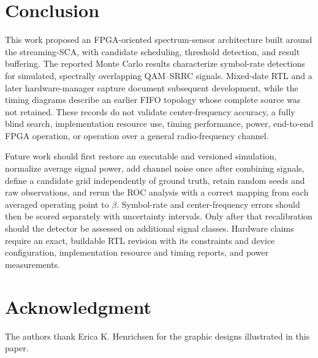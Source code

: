 \documentclass[conference]{IEEEtran}
\begin{document}
\section{Conclusion}
This work proposed an FPGA-oriented spectrum-sensor architecture built around the streaming-SCA, with candidate scheduling, threshold detection, and result buffering. The reported Monte Carlo results characterize symbol-rate detections for simulated, spectrally overlapping QAM--SRRC signals. Mixed-date RTL and a later hardware-manager capture document subsequent development, while the timing diagrams describe an earlier FIFO topology whose complete source was not retained. These records do not validate center-frequency accuracy, a fully blind search, implementation resource use, timing performance, power, end-to-end FPGA operation, or operation over a general radio-frequency channel.

Future work should first restore an executable and versioned simulation, normalize average signal power, add channel noise once after combining signals, define a candidate grid independently of ground truth, retain random seeds and raw observations, and rerun the ROC analysis with a correct mapping from each averaged operating point to $\beta$. Symbol-rate and center-frequency errors should then be scored separately with uncertainty intervals. Only after that recalibration should the detector be assessed on additional signal classes. Hardware claims require an exact, buildable RTL revision with its constraints and device configuration, implementation resource and timing reports, and power measurements.

\section*{Acknowledgment}
The authors thank Erica K. Henrichsen for the graphic designs illustrated in this paper.

\newpage
\vspace*{2.25in}


\end{document}
